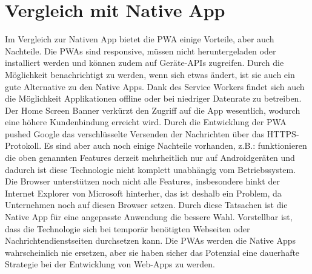 \section{Vergleich mit Native App}
Im Vergleich zur Nativen App bietet die \acl{PWA} einige Vorteile, aber auch Nachteile. Die \acs{PWA}s sind responsive, müssen nicht heruntergeladen oder\\ installiert werden und können zudem auf Geräte-APIs zugreifen. Durch die Möglichkeit benachrichtigt zu werden, wenn sich etwas ändert, ist sie auch ein gute Alternative zu den Native Apps.
Dank des Service Workers findet sich auch die Möglichkeit Applikationen offline oder bei niedriger Datenrate zu betreiben. 
Der Home Screen Banner verkürzt den Zugriff auf die App wesentlich, wodurch eine höhere Kundenbindung erreicht wird.  
Durch die Entwicklung der \acs{PWA} pushed Google das verschlüsselte Versenden der Nachrichten über das HTTPS-Protokoll.
Es sind aber auch noch einige Nachteile vorhanden, z.B.: funktionieren die oben genannten Features derzeit mehrheitlich nur auf Androidgeräten und dadurch ist diese Technologie nicht komplett unabhängig vom Betriebssystem.
Die Browser unterstützen noch nicht alle Features, insbesondere hinkt der Internet Explorer von Microsoft hinterher, das ist deshalb ein Problem, da Unternehmen noch auf diesen Browser setzen. 
Durch diese Tatsachen ist die Native App für eine angepasste Anwendung die bessere Wahl. 
Vorstellbar ist, dass die Technologie sich bei temporär benötigten Webseiten oder Nachrichtendienstseiten durchsetzen kann.
Die \acs{PWA}s werden die Native Apps wahrscheinlich nie ersetzen, aber sie haben sicher das Potenzial eine dauerhafte Strategie bei der Entwicklung von \acs{Web-App}s zu werden.



